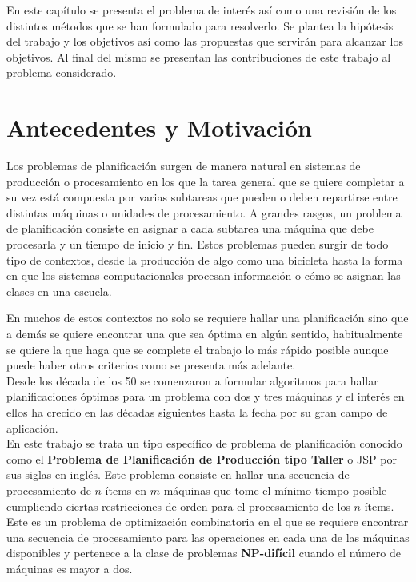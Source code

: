 En este capítulo se presenta el problema de interés así como una revisión de los distintos métodos que se han formulado para resolverlo. Se plantea la hipótesis del trabajo y los objetivos así como las propuestas que servirán para alcanzar los objetivos. Al final del mismo se presentan las contribuciones de este trabajo al problema considerado.
\section{Antecedentes y Motivación}
Los problemas de planificación surgen de manera natural en sistemas de producción o procesamiento en los que la tarea general que se quiere completar a su vez está compuesta por varias subtareas que pueden o deben repartirse entre distintas máquinas o unidades de procesamiento. A grandes rasgos, un problema de planificación consiste en asignar a cada subtarea una máquina que debe procesarla y un tiempo de inicio y fin.  Estos problemas pueden surgir de todo tipo de contextos, desde la producción de algo como una bicicleta hasta la forma en que los sistemas computacionales procesan información o cómo se asignan las clases en una escuela. 

En muchos de estos contextos no solo se requiere hallar una planificación sino que a demás se quiere encontrar una que sea óptima en algún sentido, habitualmente se quiere la que haga que se complete el trabajo lo más rápido posible aunque puede haber otros criterios como se presenta más adelante.\\
Desde los década de los 50 se comenzaron a formular algoritmos para hallar planificaciones óptimas para un problema con dos y tres máquinas\cite{johnson1954optimal} y el interés en ellos ha crecido en las décadas siguientes hasta la fecha por su gran campo de aplicación.\\ 
 
En este trabajo se trata un tipo específico de problema de planificación conocido como el \textbf{Problema de Planificación de Producción tipo Taller} o JSP por sus siglas en inglés. Este problema consiste en hallar una secuencia de procesamiento de $n$ ítems en $m$ máquinas que tome el mínimo tiempo posible cumpliendo ciertas restricciones de orden para el procesamiento de los $n$ ítems. Este es un problema de optimización combinatoria en el que se requiere encontrar una secuencia de procesamiento para las operaciones en cada una de las máquinas disponibles y pertenece a la clase de problemas \textbf{NP-difícil} cuando el número de máquinas es mayor a dos\cite{}.\\

